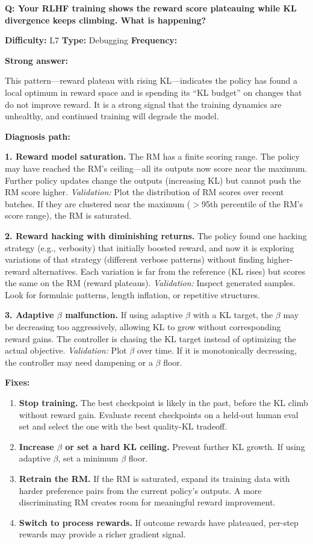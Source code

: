 \begin{interviewq}
\textbf{Q: Your RLHF training shows the reward score plateauing while KL divergence keeps climbing. What is happening?}

\textbf{Difficulty:} L7 \quad \textbf{Type:} Debugging \quad \textbf{Frequency:} \freqlow{}

\textbf{Strong answer:}

This pattern---reward plateau with rising KL---indicates the policy has found a local optimum in reward space and is spending its ``KL budget'' on changes that do not improve reward. It is a strong signal that the training dynamics are unhealthy, and continued training will degrade the model.

\textbf{Diagnosis path:}

\textbf{1. Reward model saturation.} The RM has a finite scoring range. The policy may have reached the RM's ceiling---all its outputs now score near the maximum. Further policy updates change the outputs (increasing KL) but cannot push the RM score higher. \textit{Validation:} Plot the distribution of RM scores over recent batches. If they are clustered near the maximum ($>$95th percentile of the RM's score range), the RM is saturated.

\textbf{2. Reward hacking with diminishing returns.} The policy found one hacking strategy (e.g., verbosity) that initially boosted reward, and now it is exploring variations of that strategy (different verbose patterns) without finding higher-reward alternatives. Each variation is far from the reference (KL rises) but scores the same on the RM (reward plateaus). \textit{Validation:} Inspect generated samples. Look for formulaic patterns, length inflation, or repetitive structures.

\textbf{3. Adaptive $\beta$ malfunction.} If using adaptive $\beta$ with a KL target, the $\beta$ may be decreasing too aggressively, allowing KL to grow without corresponding reward gains. The controller is chasing the KL target instead of optimizing the actual objective. \textit{Validation:} Plot $\beta$ over time. If it is monotonically decreasing, the controller may need dampening or a $\beta$ floor.

\textbf{Fixes:}
\begin{enumerate}
    \item \textbf{Stop training.} The best checkpoint is likely in the past, before the KL climb without reward gain. Evaluate recent checkpoints on a held-out human eval set and select the one with the best quality-KL tradeoff.
    \item \textbf{Increase $\beta$ or set a hard KL ceiling.} Prevent further KL growth. If using adaptive $\beta$, set a minimum $\beta$ floor.
    \item \textbf{Retrain the RM.} If the RM is saturated, expand its training data with harder preference pairs from the current policy's outputs. A more discriminating RM creates room for meaningful reward improvement.
    \item \textbf{Switch to process rewards.} If outcome rewards have plateaued, per-step rewards may provide a richer gradient signal.
\end{enumerate}


\end{interviewq}
